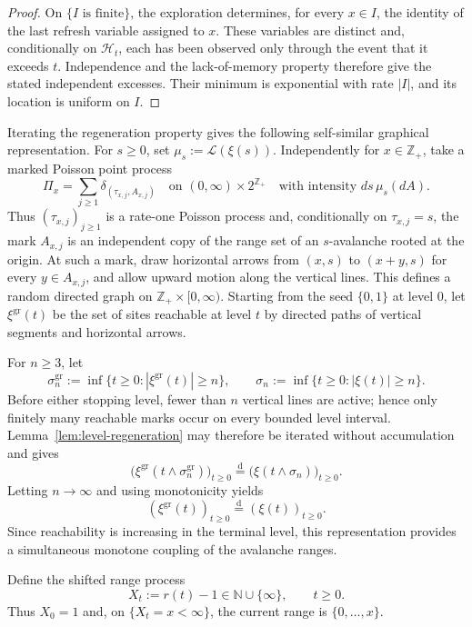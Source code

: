 \documentclass[11pt,a4paper]{amsart}
\theoremstyle{remark}
\newcommand{\N}{\mathbb N}
\newcommand{\Z}{\mathbb Z}
\begin{document}
\begin{proof}
On $\{I\text{ is finite}\}$, the exploration determines, for every
$x\in I$, the identity of the last refresh variable assigned to $x$.
These variables are distinct and, conditionally on $\mathcal H_t$, each
has been observed only through the event that it exceeds $t$. Independence
and the lack-of-memory property therefore give the stated independent
excesses. Their minimum is exponential with rate $|I|$, and its location
is uniform on $I$. 
\end{proof}



Iterating the regeneration property gives the following self-similar
graphical representation. For $s\geq0$, set
$\mu_s:=\mathcal L(\xi(s))$. Independently for $x\in\Z_+$, take a marked
Poisson point process
\[
        \Pi_x=\sum_{j\geq1}\delta_{(\tau_{x,j},A_{x,j})}
        \quad\text{on }(0,\infty)\times2^{\Z_+}
        \quad\text{with intensity }ds\,\mu_s(dA).
\]
Thus $(\tau_{x,j})_{j\geq1}$ is a rate-one Poisson process and,
conditionally on $\tau_{x,j}=s$, the mark $A_{x,j}$ is an independent
copy of the range set of an $s$-avalanche rooted at the origin. At such
a mark, draw horizontal arrows from $(x,s)$ to $(x+y,s)$ for every
$y\in A_{x,j}$, and allow upward motion along the vertical lines.
This defines a random directed graph on $\Z_+ \times [0,\infty)$.
Starting from the seed $\{0,1\}$ at level $0$, let
$\xi^{\mathrm{gr}}(t)$ be the set of sites reachable at level $t$ by
directed paths of vertical segments and horizontal arrows.

For $n\geq3$, let
\[
        \sigma_n^{\mathrm{gr}}
        :=\inf\{t\geq0:|\xi^{\mathrm{gr}}(t)|\geq n\},
        \qquad
        \sigma_n:=\inf\{t\geq0:|\xi(t)|\geq n\}.
\]
Before either stopping level, fewer than $n$ vertical lines are active;
hence only finitely many reachable marks occur on every bounded level
interval. Lemma~\ref{lem:level-regeneration} may therefore be iterated
without accumulation and gives
\[
        \bigl(\xi^{\mathrm{gr}}
        (t\wedge\sigma_n^{\mathrm{gr}})\bigr)_{t\geq0}
        \stackrel{\mathrm d}=
        \bigl(\xi(t\wedge\sigma_n)\bigr)_{t\geq0}.
\]
Letting $n\to\infty$ and using monotonicity yields
\[
        (\xi^{\mathrm{gr}}(t))_{t\geq0}
        \stackrel{\mathrm d}=
        (\xi(t))_{t\geq0}.
\]
Since reachability is increasing in the terminal level, this
representation provides a simultaneous monotone coupling of the
avalanche ranges.

Define the shifted range process
\[
        X_t:=r(t)-1\in\N\cup\{\infty\},\qquad t\geq0.
\]
Thus $X_0=1$ and, on $\{X_t=x<\infty\}$, the current range is $\{0,\ldots,x\}$.
\end{document}
